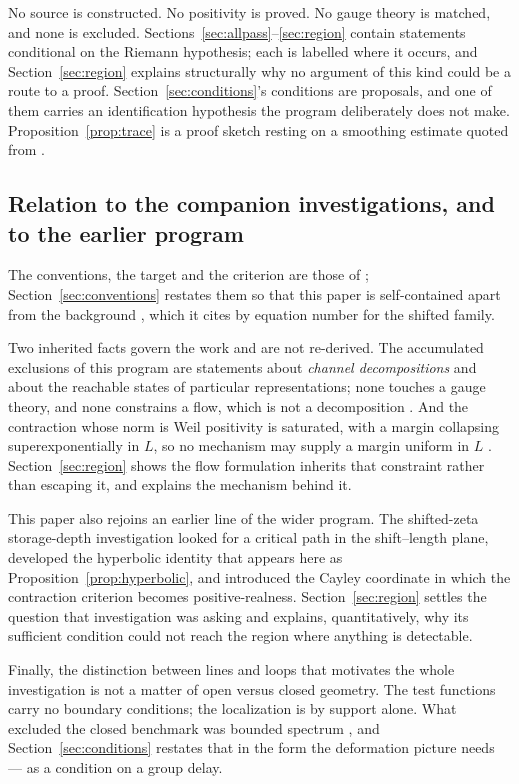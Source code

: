 No source is constructed. No positivity is proved. No gauge theory is matched,
and none is excluded. Sections~\ref{sec:allpass}--\ref{sec:region} contain
statements conditional on the Riemann hypothesis; each is labelled where it
occurs, and Section~\ref{sec:region} explains structurally why no argument of this
kind could be a route to a proof. Section~\ref{sec:conditions}'s conditions are
proposals, and one of them carries an identification hypothesis the program
deliberately does not make. Proposition~\ref{prop:trace} is a proof sketch resting
on a smoothing estimate quoted from \cite{Background}.

\subsection*{Relation to the companion investigations, and to the earlier program}

The conventions, the target and the criterion are those of
\cite{InverseBulk,Selection}; Section~\ref{sec:conventions} restates them so that
this paper is self-contained apart from the background \cite{Background}, which it
cites by equation number for the shifted family.

Two inherited facts govern the work and are not re-derived. The accumulated
exclusions of this program are statements about \emph{channel decompositions} and
about the reachable states of particular representations; none touches a gauge
theory, and none constrains a flow, which is not a decomposition
\cite{ExclusionMap}. And the contraction whose norm is Weil positivity is
saturated, with a margin collapsing superexponentially in $L$, so no mechanism
may supply a margin uniform in $L$ \cite{Selection}. Section~\ref{sec:region}
shows the flow formulation inherits that constraint rather than escaping it, and
explains the mechanism behind it.

This paper also rejoins an earlier line of the wider program. The shifted-zeta
storage-depth investigation \cite{CriticalPath,CumulativePath} looked for a
critical path in the shift--length plane, developed the hyperbolic identity that
appears here as Proposition~\ref{prop:hyperbolic}, and introduced the Cayley
coordinate in which the contraction criterion becomes positive-realness.
Section~\ref{sec:region} settles the question that investigation was asking and
explains, quantitatively, why its sufficient condition could not reach the region
where anything is detectable.

Finally, the distinction between lines and loops that motivates the whole
investigation is not a matter of open versus closed geometry. The test functions
carry no boundary conditions; the localization is by support alone. What excluded
the closed benchmark was bounded spectrum \cite{Selection,Bottleneck}, and
Section~\ref{sec:conditions} restates that in the form the deformation picture
needs --- as a condition on a group delay.

